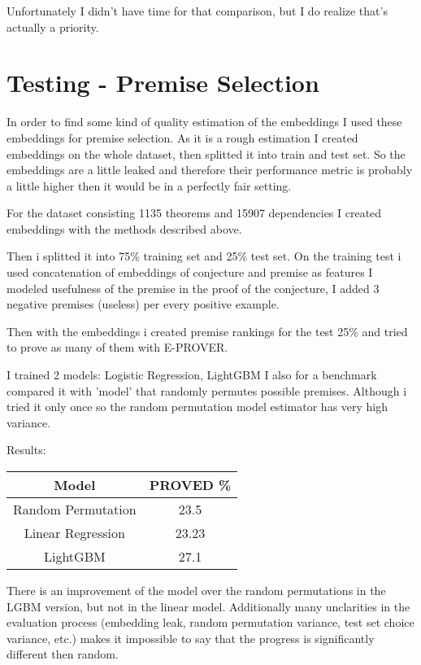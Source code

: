\documentclass{article} %
\begin{document}
Unfortunately I didn't have time for that comparison, but I do realize that's actually a priority.

\section{Testing - Premise Selection}

In order to find some kind of quality estimation of the embeddings I used these embeddings for premise selection. As it is a rough estimation I created embeddings on the whole dataset, then splitted it into train and test set. So the embeddings are a little leaked and therefore their performance metric is probably a little higher then it would be in a perfectly fair setting.

For the dataset consisting 1135 theorems and 15907 dependencies I created embeddings with the methods described above.

Then i splitted it into 75\% training set and 25\% test set.
On the training test i used concatenation of embeddings of conjecture and premise as features
I modeled usefulness of the premise in the proof of the conjecture, I added 3 negative premises (useless) per every positive example.

Then with the embeddings i created premise rankings for the test 25\% and tried to prove as many of them with E-PROVER.

I trained 2 models: Logistic Regression, LightGBM
I also for a benchmark compared it with 'model' that randomly permutes possible premises. Although i tried it only once so the random permutation model estimator has very high variance.

Results:

\begin{center}
 \begin{tabular}{||c | c||} 
 \hline
 Model & PROVED \% \\ [0.5ex] 
 \hline\hline
 Random Permutation & 23.5 \\ 
 \hline
 Linear Regression  & 23.23\\
 \hline
 LightGBM & 27.1 \\ [1ex] 
 \hline
\end{tabular}
\end{center}

There is an improvement of the model over the random permutations in the LGBM version, but not in the linear model. Additionally many unclarities in the evaluation process (embedding leak, random permutation variance, test set choice variance, etc.) makes it impossible to say that the progress is significantly different then random.
\end{document}
